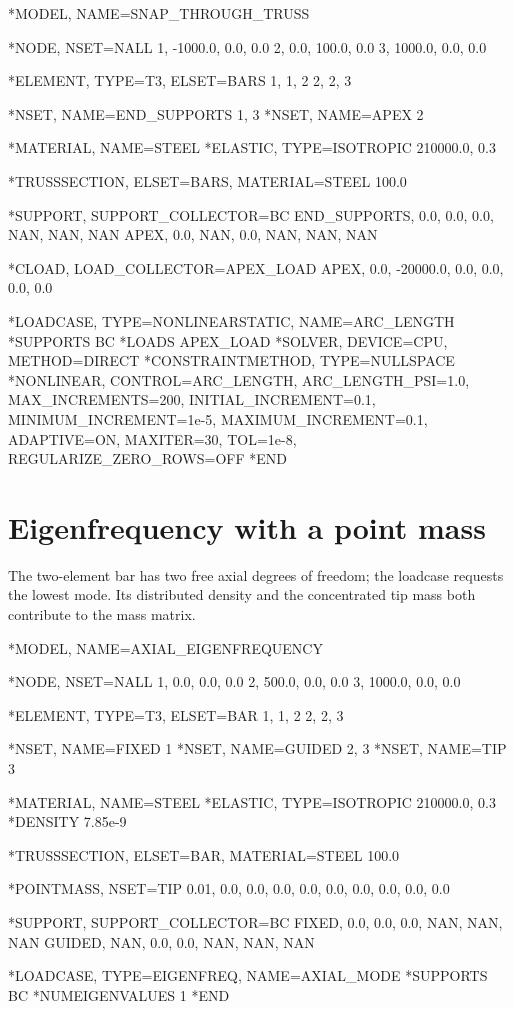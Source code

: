 \begin{exampledeck}
*MODEL, NAME=SNAP_THROUGH_TRUSS

*NODE, NSET=NALL
1, -1000.0,   0.0, 0.0
2,     0.0, 100.0, 0.0
3,  1000.0,   0.0, 0.0

*ELEMENT, TYPE=T3, ELSET=BARS
1, 1, 2
2, 2, 3

*NSET, NAME=END_SUPPORTS
1, 3
*NSET, NAME=APEX
2

*MATERIAL, NAME=STEEL
*ELASTIC, TYPE=ISOTROPIC
210000.0, 0.3

*TRUSSSECTION, ELSET=BARS, MATERIAL=STEEL
100.0

*SUPPORT, SUPPORT_COLLECTOR=BC
END_SUPPORTS, 0.0, 0.0, 0.0, NAN, NAN, NAN
APEX, 0.0, NAN, 0.0, NAN, NAN, NAN

*CLOAD, LOAD_COLLECTOR=APEX_LOAD
APEX, 0.0, -20000.0, 0.0, 0.0, 0.0, 0.0

*LOADCASE, TYPE=NONLINEARSTATIC, NAME=ARC_LENGTH
*SUPPORTS
BC
*LOADS
APEX_LOAD
*SOLVER, DEVICE=CPU, METHOD=DIRECT
*CONSTRAINTMETHOD, TYPE=NULLSPACE
*NONLINEAR, CONTROL=ARC_LENGTH, ARC_LENGTH_PSI=1.0, MAX_INCREMENTS=200, INITIAL_INCREMENT=0.1, MINIMUM_INCREMENT=1e-5, MAXIMUM_INCREMENT=0.1, ADAPTIVE=ON, MAXITER=30, TOL=1e-8, REGULARIZE_ZERO_ROWS=OFF
*END
\end{exampledeck}

\section{Eigenfrequency with a point mass}

The two-element bar has two free axial degrees of freedom; the loadcase requests the lowest mode. Its distributed density and the concentrated tip mass both contribute to the mass matrix.

\begin{exampledeck}
*MODEL, NAME=AXIAL_EIGENFREQUENCY

*NODE, NSET=NALL
1,    0.0, 0.0, 0.0
2,  500.0, 0.0, 0.0
3, 1000.0, 0.0, 0.0

*ELEMENT, TYPE=T3, ELSET=BAR
1, 1, 2
2, 2, 3

*NSET, NAME=FIXED
1
*NSET, NAME=GUIDED
2, 3
*NSET, NAME=TIP
3

*MATERIAL, NAME=STEEL
*ELASTIC, TYPE=ISOTROPIC
210000.0, 0.3
*DENSITY
7.85e-9

*TRUSSSECTION, ELSET=BAR, MATERIAL=STEEL
100.0

*POINTMASS, NSET=TIP
0.01, 0.0, 0.0, 0.0, 0.0, 0.0, 0.0, 0.0, 0.0, 0.0

*SUPPORT, SUPPORT_COLLECTOR=BC
FIXED, 0.0, 0.0, 0.0, NAN, NAN, NAN
GUIDED, NAN, 0.0, 0.0, NAN, NAN, NAN

*LOADCASE, TYPE=EIGENFREQ, NAME=AXIAL_MODE
*SUPPORTS
BC
*NUMEIGENVALUES
1
*END
\end{exampledeck}

